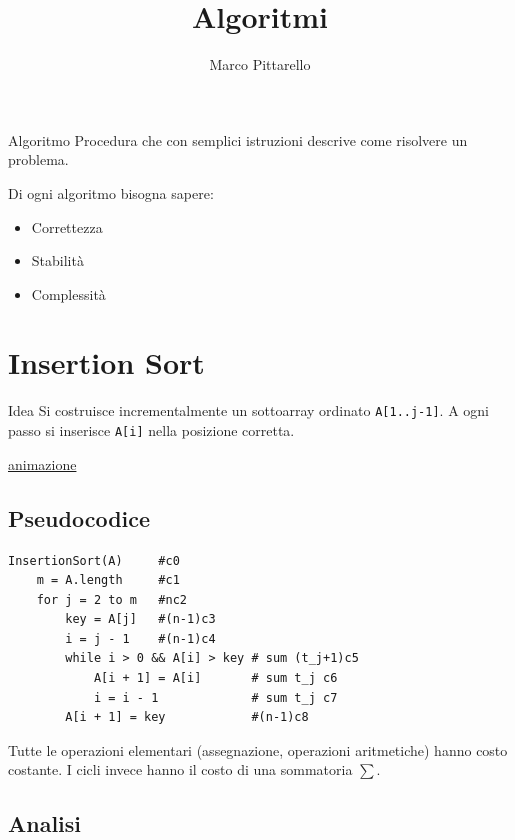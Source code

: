 \documentclass{article}
\title{Algoritmi}
\author{Marco Pittarello}
\date{}
\begin{document}
\maketitle
\tableofcontents
\newpage

\begin{defi}{Algoritmo}{}
Procedura che con semplici istruzioni descrive come risolvere un problema.
\end{defi}

Di ogni algoritmo bisogna sapere:
\begin{itemize}
    \item Correttezza
    \item Stabilità
    \item Complessità
\end{itemize}

\section{Insertion Sort}

\begin{info}{Idea}{}
Si costruisce incrementalmente un sottoarray ordinato \texttt{A[1..j-1]}.
A ogni passo si inserisce \texttt{A[i]} nella posizione corretta.
\end{info}

\href{https://upload.wikimedia.org/wikipedia/commons/9/9c/Insertion-sort-example.gif}{animazione}

\subsection{Pseudocodice}

\begin{verbatim}
InsertionSort(A)     #c0
    m = A.length     #c1
    for j = 2 to m   #nc2
        key = A[j]   #(n-1)c3
        i = j - 1    #(n-1)c4
        while i > 0 && A[i] > key # sum (t_j+1)c5
            A[i + 1] = A[i]       # sum t_j c6
            i = i - 1             # sum t_j c7
        A[i + 1] = key            #(n-1)c8
\end{verbatim}

Tutte le operazioni elementari (assegnazione, operazioni aritmetiche) hanno costo costante. I cicli invece hanno il costo di una sommatoria $\sum$.

\subsection{Analisi}
\end{document}
